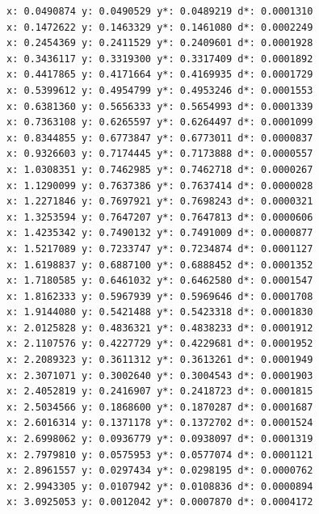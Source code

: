 \documentclass[14pt, russian]{scrartcl}
\begin{document}
\begin{verbatim}
x: 0.0490874 y: 0.0490529 y*: 0.0489219 d*: 0.0001310
x: 0.1472622 y: 0.1463329 y*: 0.1461080 d*: 0.0002249
x: 0.2454369 y: 0.2411529 y*: 0.2409601 d*: 0.0001928
x: 0.3436117 y: 0.3319300 y*: 0.3317409 d*: 0.0001892
x: 0.4417865 y: 0.4171664 y*: 0.4169935 d*: 0.0001729
x: 0.5399612 y: 0.4954799 y*: 0.4953246 d*: 0.0001553
x: 0.6381360 y: 0.5656333 y*: 0.5654993 d*: 0.0001339
x: 0.7363108 y: 0.6265597 y*: 0.6264497 d*: 0.0001099
x: 0.8344855 y: 0.6773847 y*: 0.6773011 d*: 0.0000837
x: 0.9326603 y: 0.7174445 y*: 0.7173888 d*: 0.0000557
x: 1.0308351 y: 0.7462985 y*: 0.7462718 d*: 0.0000267
x: 1.1290099 y: 0.7637386 y*: 0.7637414 d*: 0.0000028
x: 1.2271846 y: 0.7697921 y*: 0.7698243 d*: 0.0000321
x: 1.3253594 y: 0.7647207 y*: 0.7647813 d*: 0.0000606
x: 1.4235342 y: 0.7490132 y*: 0.7491009 d*: 0.0000877
x: 1.5217089 y: 0.7233747 y*: 0.7234874 d*: 0.0001127
x: 1.6198837 y: 0.6887100 y*: 0.6888452 d*: 0.0001352
x: 1.7180585 y: 0.6461032 y*: 0.6462580 d*: 0.0001547
x: 1.8162333 y: 0.5967939 y*: 0.5969646 d*: 0.0001708
x: 1.9144080 y: 0.5421488 y*: 0.5423318 d*: 0.0001830
x: 2.0125828 y: 0.4836321 y*: 0.4838233 d*: 0.0001912
x: 2.1107576 y: 0.4227729 y*: 0.4229681 d*: 0.0001952
x: 2.2089323 y: 0.3611312 y*: 0.3613261 d*: 0.0001949
x: 2.3071071 y: 0.3002640 y*: 0.3004543 d*: 0.0001903
x: 2.4052819 y: 0.2416907 y*: 0.2418723 d*: 0.0001815
x: 2.5034566 y: 0.1868600 y*: 0.1870287 d*: 0.0001687
x: 2.6016314 y: 0.1371178 y*: 0.1372702 d*: 0.0001524
x: 2.6998062 y: 0.0936779 y*: 0.0938097 d*: 0.0001319
x: 2.7979810 y: 0.0575953 y*: 0.0577074 d*: 0.0001121
x: 2.8961557 y: 0.0297434 y*: 0.0298195 d*: 0.0000762
x: 2.9943305 y: 0.0107942 y*: 0.0108836 d*: 0.0000894
x: 3.0925053 y: 0.0012042 y*: 0.0007870 d*: 0.0004172

  \end{verbatim}
\end{document}
